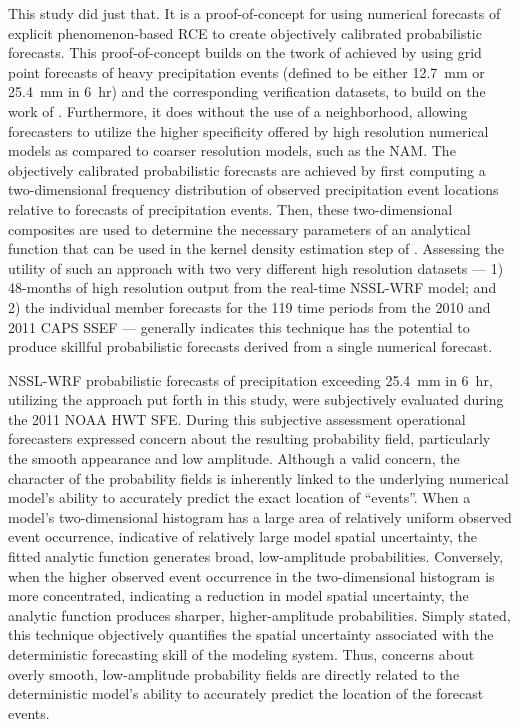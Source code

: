 This study did just that.
It is a proof-of-concept for using numerical forecasts of explicit phenomenon-based RCE to create objectively calibrated probabilistic forecasts.
This proof-of-concept builds on the twork of \cite{Sobash2011} achieved by using grid point forecasts of heavy precipitation events (defined to be either \mbox{12.7 mm} or \mbox{25.4 mm} in \mbox{6 hr}) and the corresponding verification datasets, to build on the work of \cite{Sobash2011}.
Furthermore, it does without the use of a neighborhood, allowing forecasters to utilize the higher specificity offered by high resolution numerical models as compared to coarser resolution models, such as the NAM.
The objectively calibrated probabilistic forecasts are achieved by first computing a two-dimensional frequency distribution of observed precipitation event locations relative to forecasts of precipitation events.
Then, these two-dimensional composites are used to determine the necessary parameters of an analytical function that can be used in the kernel density estimation step of \cite{Sobash2011}.
Assessing the utility of such an approach with two very different high resolution datasets --- 1) 48-months of high resolution output from the real-time NSSL-WRF model; and 2) the individual member forecasts for the 119 time periods from the 2010 and 2011 CAPS SSEF --- generally indicates this technique has the potential to produce skillful probabilistic forecasts derived from a single numerical forecast.


NSSL-WRF probabilistic forecasts of precipitation exceeding \mbox{25.4 mm} in \mbox{6 hr}, utilizing the approach put forth in this study, were subjectively evaluated during the 2011 NOAA HWT SFE.
During this subjective assessment operational forecasters expressed concern about the resulting probability field, particularly the smooth appearance and low amplitude.
Although a valid concern, the character of the probability fields is inherently linked to the underlying numerical model's ability to accurately predict the exact location of ``events''.
When a model's two-dimensional histogram has a large area of relatively uniform observed event occurrence, indicative of relatively large model spatial uncertainty, the fitted analytic function generates broad, low-amplitude probabilities.
Conversely, when the higher observed event occurrence in the two-dimensional histogram is more concentrated, indicating a reduction in model spatial uncertainty, the analytic function produces sharper, higher-amplitude probabilities.
Simply stated, this technique objectively quantifies the spatial uncertainty associated with the deterministic forecasting skill of the modeling system.
Thus, concerns about overly smooth, low-amplitude probability fields are directly related to the deterministic model's ability to accurately predict the location of the forecast events.


